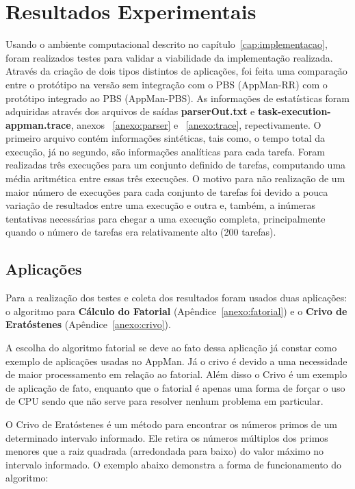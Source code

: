 \chapter{Resultados Experimentais}
\label{cap:resultados}

Usando o ambiente computacional descrito no capítulo~\ref{cap:implementacao}, foram realizados testes para validar a viabilidade da implementação realizada. Através da criação de dois tipos distintos de aplicações, foi feita uma comparação entre o protótipo na versão sem integração com o PBS (AppMan-RR) com o protótipo integrado ao PBS (AppMan-PBS). As informações de estatísticas foram adquiridas através dos arquivos de saídas {\bf parserOut.txt} e {\bf task-execution-appman.trace}, anexos ~\ref{anexo:parser} e ~\ref{anexo:trace}, repectivamente. O primeiro arquivo contém informações sintéticas, tais como, o tempo total da execução, já no segundo, são informações analíticas para cada tarefa. Foram realizadas três execuções para um conjunto definido de tarefas, computando uma média aritmética entre essas três execuções. O motivo para não realização de um maior número de execuções para cada conjunto de tarefas foi devido a pouca variação de resultados entre uma execução e outra e, também, a inúmeras tentativas necessárias para chegar a uma execução completa, principalmente quando o número de tarefas era relativamente alto (200 tarefas).

\section{Aplicações}

Para a realização dos testes e coleta dos resultados foram usados duas aplicações: o algoritmo para \textbf{Cálculo do Fatorial} (Apêndice~\ref{anexo:fatorial}) e o \textbf{Crivo de Eratóstenes} (Apêndice~\ref{anexo:crivo}).

A escolha do algoritmo fatorial se deve ao fato dessa aplicação já constar como exemplo de aplicações usadas no AppMan. Já o crivo é devido a uma necessidade de maior processamento em relação ao fatorial. Além disso o Crivo é um exemplo de aplicação de fato, enquanto que o fatorial é apenas uma forma de forçar o uso de CPU sendo que não serve para resolver nenhum problema em particular.

O Crivo de Eratóstenes é um método para encontrar os números primos de um determinado intervalo informado. Ele retira os números múltiplos dos primos menores que a raiz quadrada (arredondada para baixo) do valor máximo no intervalo informado. O exemplo abaixo demonstra a forma de funcionamento do algoritmo:

